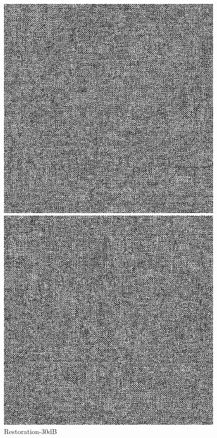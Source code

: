 \documentclass{article}
\begin{document}
\begin{figure}[H]
	\centering
	\begin{minipage}[b]{0.32\linewidth}
		\includegraphics[width=\linewidth,bb=0 0 20cm 20cm]{df3.bmp}
		\caption*{Restoration-30dB}
	\end{minipage}
	\begin{minipage}[b]{0.32\linewidth}
		\includegraphics[width=\linewidth,bb=0 0 20cm 20cm]{df2.bmp}

\end{minipage}
\end{figure}
\end{document}
